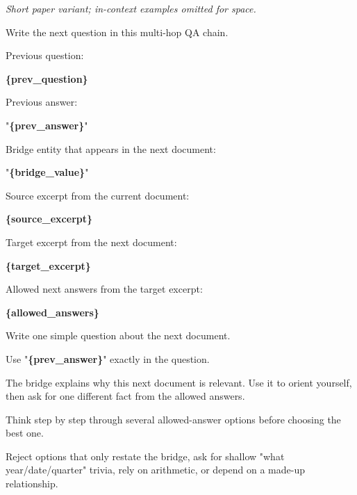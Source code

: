 \begin{tcolorbox}[colback=white, colframe=my-green, coltitle=black, parskip=5mm, title=\textbf{Next-Hop Question, Pick Target (Short)}, halign=flush left, enhanced, breakable, skin first=enhanced, skin middle=enhanced, skin last=enhanced]
\begin{scriptsize}
\ttfamily
\setlength{\parindent}{0pt}
\normalfont\textit{Short paper variant; in-context examples omitted for space.}\par
\medskip
\ttfamily
Write the next question in this multi-hop QA chain.\par
\mbox{}\par
Previous question:\par
\textcolor{my-green}{\textbf{\{prev\_question\}}}\par
\mbox{}\par
Previous answer:\par
"\textcolor{my-green}{\textbf{\{prev\_answer\}}}"\par
\mbox{}\par
Bridge entity that appears in the next document:\par
"\textcolor{my-green}{\textbf{\{bridge\_value\}}}"\par
\mbox{}\par
Source excerpt from the current document:\par
\textcolor{my-green}{\textbf{\{source\_excerpt\}}}\par
\mbox{}\par
Target excerpt from the next document:\par
\textcolor{my-green}{\textbf{\{target\_excerpt\}}}\par
\mbox{}\par
Allowed next answers from the target excerpt:\par
\textcolor{my-green}{\textbf{\{allowed\_answers\}}}\par
\mbox{}\par
Write one simple question about the next document.\par
Use "\textcolor{my-green}{\textbf{\{prev\_answer\}}}" exactly in the question.\par
The bridge explains why this next document is relevant. Use it to orient yourself, then ask for one different fact from the allowed answers.\par
Think step by step through several allowed-answer options before choosing the best one.\par
Reject options that only restate the bridge, ask for shallow "what year/date/quarter" trivia, rely on arithmetic, or depend on a made-up relationship.\par

\end{scriptsize}
\end{tcolorbox}

